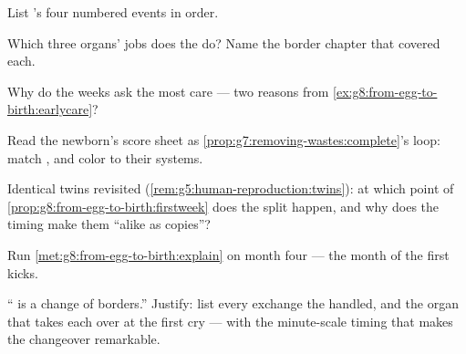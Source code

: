 \begin{exercise}[$\star$]\label{exo:g8:from-egg-to-birth:6}
List 's four numbered events in order.
\end{exercise}

\begin{exercise}[$\star\star$]\label{exo:g8:from-egg-to-birth:7}
Which three organs' jobs does the  do? Name the
border chapter that covered each.
\end{exercise}

\begin{exercise}[$\star\star$]\label{exo:g8:from-egg-to-birth:8}
Why do the  weeks ask the most care --- two
reasons from \cref{ex:g8:from-egg-to-birth:earlycare}?
\end{exercise}

\begin{exercise}[$\star\star$]\label{exo:g8:from-egg-to-birth:9}
Read the newborn's score sheet as
\cref{prop:g7:removing-wastes:complete}'s loop: match
,  and color to their systems.
\end{exercise}

\begin{exercise}[$\star\star$]\label{exo:g8:from-egg-to-birth:10}
Identical twins revisited
(\cref{rem:g5:human-reproduction:twins}): at which point
of \cref{prop:g8:from-egg-to-birth:firstweek} does the
 split happen, and why does the timing make
them ``alike as copies''?
\end{exercise}

\begin{exercise}[$\star\star$]\label{exo:g8:from-egg-to-birth:11}
Run \cref{met:g8:from-egg-to-birth:explain} on month
four --- the month of the first kicks.
\end{exercise}

\begin{exercise}[$\star\star\star$]\label{exo:g8:from-egg-to-birth:12}
`` is a change of borders.'' Justify: list every
exchange the  handled, and the organ that takes
each over at the first cry --- with the minute-scale
timing that makes the changeover remarkable.
\end{exercise}

